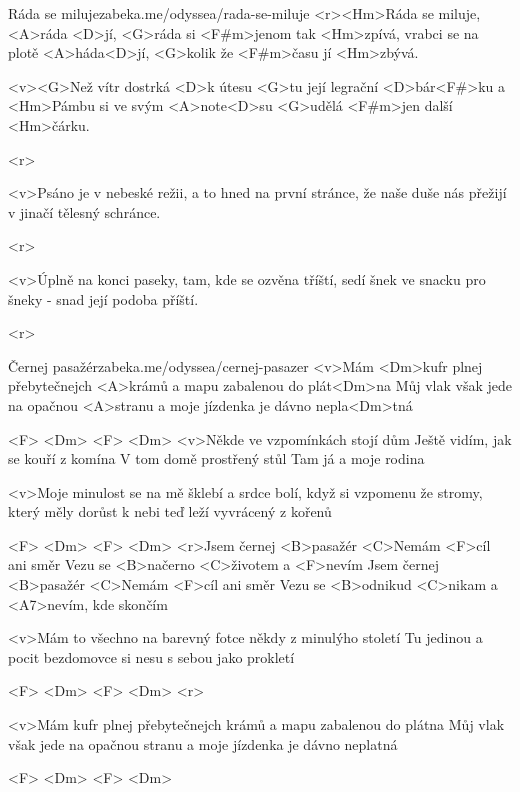 \begin{song}{35}{Ráda se miluje}{zabeka.me/odyssea/rada-se-miluje}
	<r><Hm>Ráda se miluje, <A>ráda <D>jí,
	<G>ráda si <F#m>jenom tak <Hm>zpívá,
	vrabci se na plotě <A>háda<D>jí,
	<G>kolik že <F#m>času jí <Hm>zbývá.

	<v><G>Než vítr dostrká <D>k útesu <G>tu její legrační <D>bár<F#>ku
	a <Hm>Pámbu si ve svým <A>note<D>su <G>udělá <F#m>jen další <Hm>čárku.

	<r>

	<v>Psáno je v nebeské režii, a to hned na první stránce,
	že naše duše nás přežijí v jinačí tělesný schránce.

	<r>

	<v>Úplně na konci paseky, tam, kde se ozvěna tříští,
	sedí šnek ve snacku pro šneky - snad její podoba příští.

	<r>
\end{song}
\begin{song}[Traband]{36}{Černej pasažér}{zabeka.me/odyssea/cernej-pasazer}
	<v>Mám <Dm>kufr plnej přebytečnejch <A>krámů
	a mapu zabalenou do plát<Dm>na
	Můj vlak však jede na opačnou <A>stranu
	a moje jízdenka je dávno nepla<Dm>tná

	<F> <Dm> <F> <Dm>
	<v>Někde ve vzpomínkách stojí dům
	Ještě vidím, jak se kouří z komína
	V tom domě prostřený stůl
	Tam já a moje rodina

	<v>Moje minulost se na mě šklebí
	a srdce bolí, když si vzpomenu
	že stromy, který měly dorůst k nebi
	teď leží vyvrácený z kořenů

	<F> <Dm> <F> <Dm>
	<r>Jsem černej <B>pasažér
	<C>Nemám <F>cíl ani směr
	Vezu se <B>načerno <C>životem a <F>nevím
	Jsem černej <B>pasažér
	<C>Nemám <F>cíl ani směr
	Vezu se <B>odnikud <C>nikam a <A7>nevím, kde skončím

	<v>Mám to všechno na barevný fotce
	někdy z minulýho století
	Tu jedinou a pocit bezdomovce
	si nesu s sebou jako prokletí

	<F> <Dm> <F> <Dm>
	<r>

	<v>Mám kufr plnej přebytečnejch krámů
	a mapu zabalenou do plátna
	Můj vlak však jede na opačnou stranu
	a moje jízdenka je dávno neplatná

	<F> <Dm> <F> <Dm>

\end{song}
